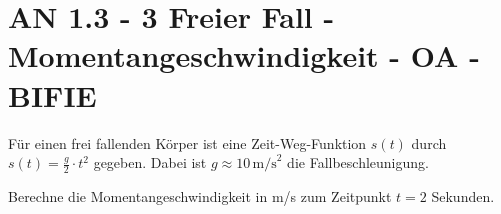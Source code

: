 \section{AN 1.3 - 3 Freier Fall - Momentangeschwindigkeit - OA - BIFIE}


\begin{beispiel}[AN 1.3]{1} %
Für einen frei fallenden Körper ist eine Zeit-Weg-Funktion $s(t)$ durch $s(t)=\frac{g}{2}\cdot t^2$ gegeben. Dabei ist $g \approx 10\,\text{m/s}^2$ die Fallbeschleunigung.

\leer

Berechne die Momentangeschwindigkeit in m/s zum Zeitpunkt $t=2$ Sekunden.

\end{beispiel}